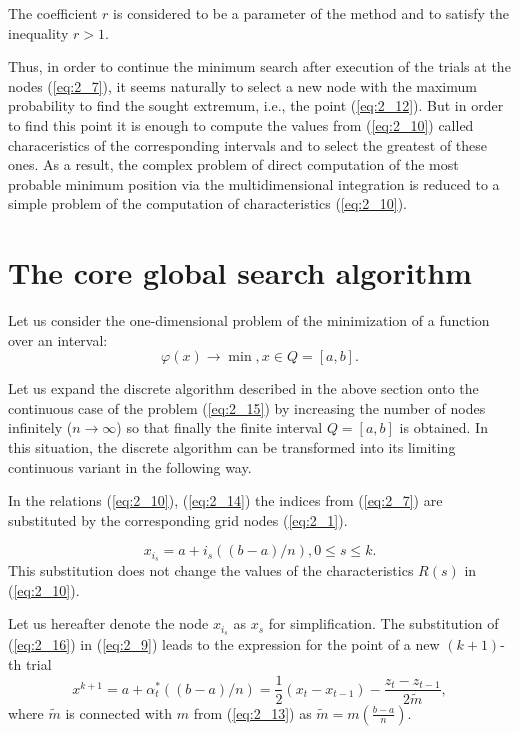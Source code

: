 The coefficient $r$ is considered to be a parameter of the method and to satisfy the inequality $r>1$.

Thus, in order to continue the minimum search after execution of the trials at the nodes (\ref{eq:2_7}), it seems naturally to select a new node with the maximum probability to find the sought extremum, i.e., the point (\ref{eq:2_12}). But in order to find this point it is enough to compute the values   from (\ref{eq:2_10}) called characeristics of the corresponding intervals   and to select the greatest of these ones. As a result, the complex problem of direct computation of the most probable minimum position via the multidimensional integration is reduced to a simple problem of the computation of characteristics (\ref{eq:2_10}).

\section{The core global search algorithm}
\label{sec:2_2}
Let us consider the one-dimensional problem of the minimization of a function over an interval:
\begin{equation}
\label{eq:2_15}
\varphi(x)\rightarrow \min,x\in Q=[a,b]. 
\end{equation}

Let us expand the discrete algorithm described in the above section onto the continuous case of the problem (\ref{eq:2_15}) by increasing the number of nodes infinitely ($n\rightarrow \infty$) so that finally the finite interval $Q=[a,b]$  is obtained. In this situation, the discrete algorithm can be transformed into its limiting continuous variant in the following way.

In the relations (\ref{eq:2_10}), (\ref{eq:2_14}) the indices  from (\ref{eq:2_7}) are substituted by the corresponding grid nodes (\ref{eq:2_1}). 

\begin{equation}
\label{eq:2_16}
x_{i_s}=a+i_s((b-a)/n), 0\leq s\leq k. 
\end{equation}
This substitution does not change the values of the characteristics $R(s)$ in (\ref{eq:2_10}). 

Let us hereafter denote the node $x_{i_s}$ as $x_s$  for simplification. The substitution of (\ref{eq:2_16}) in (\ref{eq:2_9}) leads to the expression for the point of a new  $(k+1)$-th trial
\begin{equation}
\label{eq:2_17}
x^{k+1}=a+\alpha_t^*((b-a)/n)=\frac{1}{2}(x_t-x_{t-1})-\frac{z_t-z_{t-1}}{2\tilde{m}},
\end{equation}
where $\tilde{m}$ is connected with $m$ from (\ref{eq:2_13}) as $\tilde{m}=m(\frac{b-a}{n})$.

